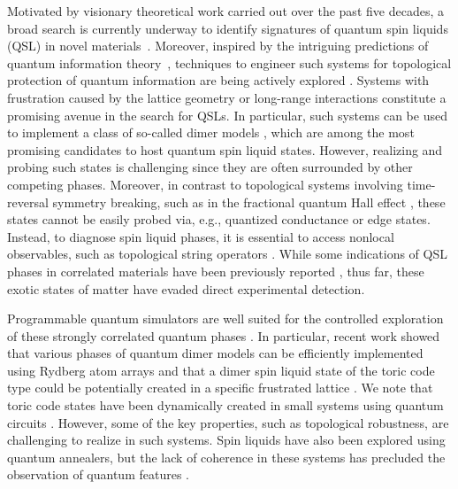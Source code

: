 \documentclass[twocolumn,amssymb,secnumarabic, prl, aps, nofootinbib]{revtex4-1}
\begin{document}
Motivated by visionary theoretical work carried out over the past five decades, a broad  search is currently underway 
to identify signatures of quantum spin liquids (QSL) in novel materials~\cite{WenReview2017,SachdevReview2018}.
Moreover, inspired by the  intriguing predictions of quantum information theory~\cite{Kitaev2003fault}, techniques to engineer such systems for topological protection of quantum information are being actively explored \cite{Nayak2008}.
Systems with frustration \cite{savary2016quantum} caused by the lattice geometry or long-range interactions constitute a promising avenue in the search for QSLs. In particular, such systems can be used to implement a class of so-called dimer models \cite{Rokhsar88,Read91,SachdevPRB1992,Moessner01,Misguich02}, which 
are among the most promising candidates to host quantum spin liquid states. However, realizing and probing such states is challenging since they 
are often surrounded by other competing phases.
Moreover, in contrast to topological systems involving time-reversal symmetry breaking, such as in the fractional quantum Hall effect \cite{Halperin20}, these states cannot be easily probed via, e.g., quantized conductance or edge states. Instead, to diagnose spin liquid phases, it is essential to access nonlocal observables, such as topological string operators \cite{WenReview2017,SachdevReview2018}.    
While some indications of QSL phases in correlated materials have been previously reported \cite{YoungLee2012,Imai2015}, thus far, these exotic states of matter have evaded direct experimental detection.

Programmable quantum simulators are well suited for the controlled exploration of these strongly correlated quantum phases \cite{Gross2017,weimer_rydberg_2010,Hermele2009,Yao2013,Glaetzle14,Celi20,BrowaeysSSH}. In particular, recent work showed that various phases of quantum dimer models can be efficiently implemented using Rydberg atom arrays \cite{Rhine2020a} and that a dimer spin liquid state of the toric code type could be potentially created in a specific frustrated lattice \cite{Ruben2020}. We note that toric code states have been dynamically created in small systems using quantum circuits \cite{JWPanPRL2018,Wallraff2020}. However, some of the key properties, %
such as topological robustness, are challenging to realize in such systems.  
Spin liquids have also been explored using quantum annealers, but the lack of coherence in these systems has precluded the observation of quantum features \cite{Zhou20}. 
\end{document}
